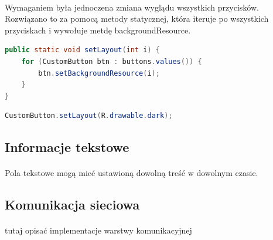 \paragraph{}
Wymaganiem była jednoczena zmiana wyglądu wszystkich przycisków. Rozwiązano to za pomocą metody statycznej, która iteruje po wszystkich przyciskach i wywołuje metdę backgroundResource.


\begin{lstlisting}[language=Java]
 public static void setLayout(int i) {
    for (CustomButton btn : buttons.values()) {
        btn.setBackgroundResource(i);
    }
}
\end{lstlisting}


\begin{lstlisting}[language=Java]
CustomButton.setLayout(R.drawable.dark);
\end{lstlisting}



\subsection{Informacje tekstowe}
\paragraph{}
Pola tekstowe mogą mieć ustawioną dowolną treść w dowolnym czasie.

\subsection{Komunikacja sieciowa}
\paragraph{}
{\color{red}tutaj opisać implementacje warstwy komunikacyjnej}
